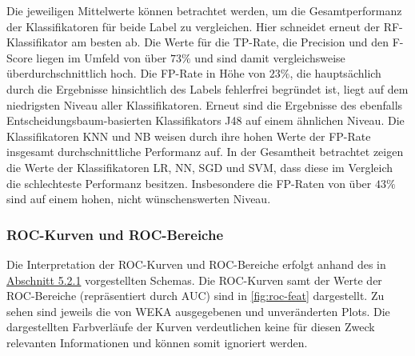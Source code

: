 Die jeweiligen Mittelwerte können betrachtet werden, um die Gesamtperformanz der Klassifikatoren für beide Label zu vergleichen. Hier schneidet erneut der RF-Klassifikator am besten ab. Die Werte für die TP-Rate, die Precision und den F-Score liegen im Umfeld von über $73\%$ und sind damit vergleichsweise überdurchschnittlich hoch. Die FP-Rate in Höhe von $23\%$, die hauptsächlich durch die Ergebnisse hinsichtlich des Labels \glqq fehlerfrei\grqq{} begründet ist, liegt auf dem niedrigsten Niveau aller Klassifikatoren. Erneut sind die Ergebnisse des ebenfalls Entscheidungsbaum-basierten Klassifikators J48 auf einem ähnlichen Niveau. Die Klassifikatoren KNN und NB weisen durch ihre hohen Werte der FP-Rate insgesamt durchschnittliche Performanz auf. In der Gesamtheit betrachtet zeigen die Werte der Klassifikatoren LR, NN, SGD und SVM, dass diese im Vergleich die schlechteste Performanz besitzen. Insbesondere die FP-Raten von über $43\%$ sind auf einem hohen, nicht wünschenswerten Niveau. 

\subsubsection*{ROC-Kurven und ROC-Bereiche}

Die Interpretation der ROC-Kurven und ROC-Bereiche erfolgt anhand des in \hyperref[roc-def]{Abschnitt 5.2.1} vorgestellten Schemas. Die ROC-Kurven samt der Werte der ROC-Bereiche (repräsentiert durch \glqq AUC\grqq{}) sind in \autoref{fig:roc-feat}  dargestellt. Zu sehen sind jeweils die von WEKA ausgegebenen und unveränderten Plots. Die dargestellten Farbverläufe der Kurven verdeutlichen keine für diesen Zweck relevanten Informationen und können somit ignoriert werden.

